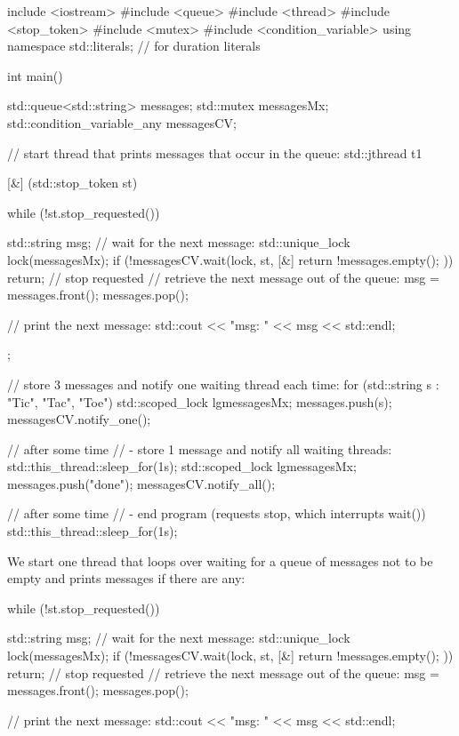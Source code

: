 
\begin{cpp}
include <iostream>
#include <queue>
#include <thread>
#include <stop_token>
#include <mutex>
#include <condition_variable>
using namespace std::literals; // for duration literals

int main()
{
	std::queue<std::string> messages;
	std::mutex messagesMx;
	std::condition_variable_any messagesCV;
	
	// start thread that prints messages that occur in the queue:
	std::jthread t1{[&] (std::stop_token st) {
			while (!st.stop_requested()) {
				std::string msg;
				{
					// wait for the next message:
					std::unique_lock lock(messagesMx);
					if (!messagesCV.wait(lock, st,
										[&] {
											return !messages.empty();
										})) {
						return; // stop requested
					}
					// retrieve the next message out of the queue:
					msg = messages.front();
					messages.pop();
				}
				
				// print the next message:
				std::cout << "msg: " << msg << std::endl;
			}
	}};

	// store 3 messages and notify one waiting thread each time:
	for (std::string s : {"Tic", "Tac", "Toe"}) {
		std::scoped_lock lg{messagesMx};
		messages.push(s);
		messagesCV.notify_one();
	}
	
	// after some time
	// - store 1 message and notify all waiting threads:
	std::this_thread::sleep_for(1s);
	{
		std::scoped_lock lg{messagesMx};
		messages.push("done");
		messagesCV.notify_all();
	}
	
	// after some time
	// - end program (requests stop, which interrupts wait())
	std::this_thread::sleep_for(1s);
}
\end{cpp}

We start one thread that loops over waiting for a queue of messages not to be empty and prints messages if there are any:

\begin{cpp}
while (!st.stop_requested()) {
	std::string msg;
	{
		// wait for the next message:
		std::unique_lock lock(messagesMx);
		if (!messagesCV.wait(lock, st,
							[&] {
								return !messages.empty();
							})) {
			return; // stop requested
		}
		// retrieve the next message out of the queue:
		msg = messages.front();
		messages.pop();
	}
	
	// print the next message:
	std::cout << "msg: " << msg << std::endl;
}
\end{cpp}

